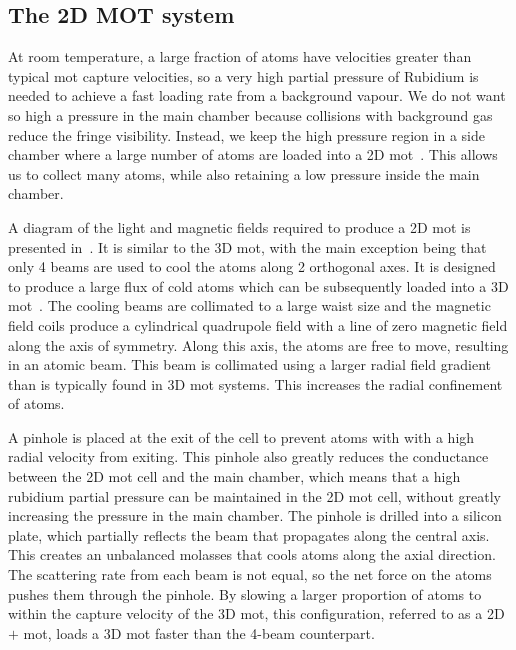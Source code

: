 \subsection{The 2D MOT system}\label{sec:2d_mot}
At room temperature, a large fraction of atoms have velocities greater than typical \ac{mot} capture velocities, so a very high partial pressure of
Rubidium is needed to achieve a fast loading rate from a background
vapour. We do not want so high a pressure in the main chamber because
collisions with background gas reduce the fringe visibility. Instead,
we keep the high pressure region in a side chamber where a large
number of atoms are loaded into a 2D
\ac{mot}~\cite{Dieckmann1998}. This allows us to collect many atoms,
while also retaining a
low pressure inside the main chamber. \par\noindent 
A diagram of the light and magnetic fields
required to produce a 2D \ac{mot} is presented
in~. It is similar to the 3D \ac{mot}, with the
main exception being that only 4 beams are used to cool the atoms along 2
orthogonal axes. It is designed to produce a large flux of cold atoms which can be subsequently loaded into a
3D \ac{mot}~\cite{Muller2007,Roos2003}. The cooling beams are collimated to a
large waist size and the magnetic field coils produce a cylindrical quadrupole
field with a line of zero magnetic field along the axis of symmetry. Along this
axis, the atoms are free to move, resulting in an atomic beam. This
beam is collimated using a larger radial field gradient than is
typically found in 3D \ac{mot} systems. This increases the radial
confinement of
atoms. 
\par\noindent 
A pinhole is placed at the exit of the cell to prevent atoms with
with a high radial velocity from exiting. This pinhole also
greatly reduces the conductance between the 2D \ac{mot} cell and the main
chamber, which means that a high rubidium partial pressure can be maintained in the 2D \ac{mot} cell, without greatly
increasing the pressure in the main chamber. The pinhole is drilled into a
silicon plate, which partially reflects the beam that propagates along
the central axis. This creates an unbalanced molasses that cools atoms
along the axial direction. The scattering rate from each beam is not
equal, so the net force on the atoms pushes them through the pinhole.
By slowing a larger proportion of atoms to within the
capture velocity of the 3D \ac{mot}, this configuration, referred to as a 2D\(+\)
\ac{mot}, loads a 3D \ac{mot} faster than the 4-beam counterpart. \par\noindent
